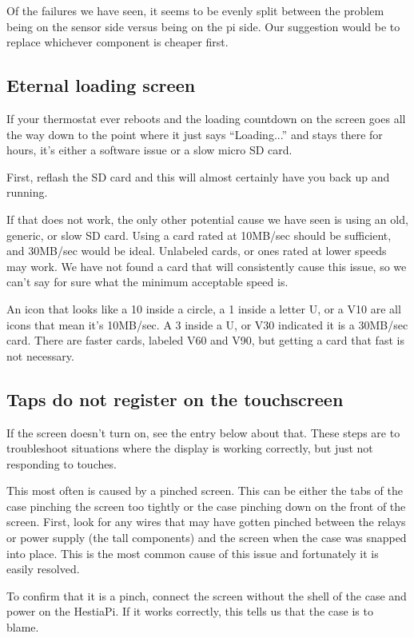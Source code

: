 Of the failures we have seen, it seems to be evenly split between the problem
being on the sensor side versus being on the pi side. Our suggestion would be
to replace whichever component is cheaper first.

\subsection{Eternal loading screen}
If your thermostat ever reboots and the loading countdown on the screen goes
all the way down to the point where it just says ``Loading...'' and stays there
for hours, it's either a software issue or a slow micro SD card.

First, reflash the SD card and this will almost certainly have you back up and
running.

If that does not work, the only other potential cause we have seen is using an
old, generic, or slow SD card. Using a card rated at 10MB/sec should be
sufficient, and 30MB/sec would be ideal. Unlabeled cards, or ones rated at
lower speeds may work. We have not found a card that will consistently cause
this issue, so we can't say for sure what the minimum acceptable speed is.

An icon that looks like a 10 inside a circle, a 1 inside a letter U, or a V10
are all icons that mean it's 10MB/sec. A 3 inside a U, or V30 indicated it is
a 30MB/sec card. There are faster cards, labeled V60 and V90, but getting a
card that fast is not necessary.

\subsection{Taps do not register on the touchscreen}
If the screen doesn't turn on, see the entry below about that. These steps are
to troubleshoot situations where the display is working correctly, but just not
responding to touches.

This most often is caused by a pinched screen. This can be either the tabs of
the case pinching the screen too tightly or the case pinching down on the front
of the screen. First, look for any wires that may have gotten pinched between
the relays or power supply (the tall components) and the screen when the case
was snapped into place. This is the most common cause of this issue and
fortunately it is easily resolved.

To confirm that it is a pinch, connect the screen without the shell of the case
and power on the HestiaPi. If it works correctly, this tells us that the case
is to blame.


